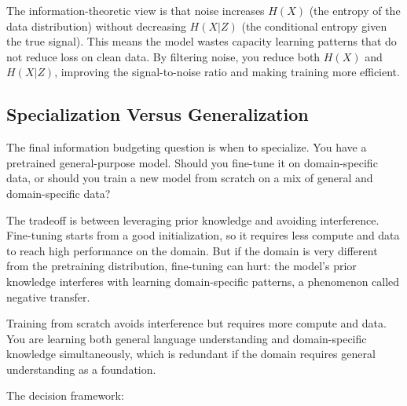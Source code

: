 The information-theoretic view is that noise increases $H(X)$ (the entropy of the data distribution) without decreasing $H(X|Z)$ (the conditional entropy given the true signal). This means the model wastes capacity learning patterns that do not reduce loss on clean data. By filtering noise, you reduce both $H(X)$ and $H(X|Z)$, improving the signal-to-noise ratio and making training more efficient.

\vspace{1em}

\subsection{Specialization Versus Generalization}

The final information budgeting question is when to specialize. You have a pretrained general-purpose model. Should you fine-tune it on domain-specific data, or should you train a new model from scratch on a mix of general and domain-specific data?

The tradeoff is between leveraging prior knowledge and avoiding interference. Fine-tuning starts from a good initialization, so it requires less compute and data to reach high performance on the domain. But if the domain is very different from the pretraining distribution, fine-tuning can hurt: the model's prior knowledge interferes with learning domain-specific patterns, a phenomenon called negative transfer.

Training from scratch avoids interference but requires more compute and data. You are learning both general language understanding and domain-specific knowledge simultaneously, which is redundant if the domain requires general understanding as a foundation.

The decision framework:


